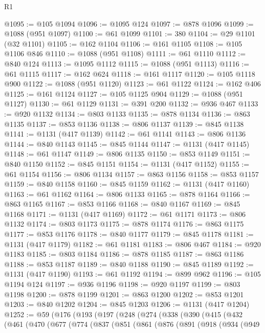 \begin{lexlean}{R1}
\begin{coremodule}
{{{{{{{{{{{{{{{{{{{{{{{{{{{{{{{{{{{{{{{{{{{{{{{{{{{{{{{{{{{{{{{{{{{{{{{{{{{{{{{{{{{{{{{{{{@1095 := @105 @1094
@1096 := @1095 @124
@1097 := @878 @1096
@1099 := @1088 (@951 @1097)
@1100 := @61 @1099
@1101 := 380
@1104 := @29 @1101 (@32 @1101)
@1105 := @162 @1104
@1106 := @161 @1105
@1108 := @105 @1106 @846
@1110 := @1088 (@951 @1108)
@1111 := @61 @1110
@1112 := @840 @124
@1113 := @1095 @1112
@1115 := @1088 (@951 @1113)
@1116 := @61 @1115
@1117 := @162 @624
@1118 := @161 @1117
@1120 := @105 @1118 @900
@1122 := @1088 (@951 @1120)
@1123 := @61 @1122
@1124 := @162 @406
@1125 := @161 @1124
@1127 := @105 @1125 @904
@1129 := @1088 (@951 @1127)
@1130 := @61 @1129
@1131 := @391 @200
@1132 := @936 @467
@1133 := @920 @1132
@1134 := @803 @1133
@1135 := @878 @1134
@1136 := @863 @1135
@1137 := @853 @1136
@1138 := @806 @1137
@1139 := @845 @1138
@1141 := @1131 (@417 @1139)
@1142 := @61 @1141
@1143 := @806 @1136
@1144 := @840 @1143
@1145 := @845 @1144
@1147 := @1131 (@417 @1145)
@1148 := @61 @1147
@1149 := @806 @1135
@1150 := @853 @1149
@1151 := @840 @1150
@1152 := @845 @1151
@1154 := @1131 (@417 @1152)
@1155 := @61 @1154
@1156 := @806 @1134
@1157 := @863 @1156
@1158 := @853 @1157
@1159 := @840 @1158
@1160 := @845 @1159
@1162 := @1131 (@417 @1160)
@1163 := @61 @1162
@1164 := @806 @1133
@1165 := @878 @1164
@1166 := @863 @1165
@1167 := @853 @1166
@1168 := @840 @1167
@1169 := @845 @1168
@1171 := @1131 (@417 @1169)
@1172 := @61 @1171
@1173 := @806 @1132
@1174 := @803 @1173
@1175 := @878 @1174
@1176 := @863 @1175
@1177 := @853 @1176
@1178 := @840 @1177
@1179 := @845 @1178
@1181 := @1131 (@417 @1179)
@1182 := @61 @1181
@1183 := @806 @467
@1184 := @920 @1183
@1185 := @803 @1184
@1186 := @878 @1185
@1187 := @863 @1186
@1188 := @853 @1187
@1189 := @840 @1188
@1190 := @845 @1189
@1192 := @1131 (@417 @1190)
@1193 := @61 @1192
@1194 := @899 @962
@1196 := @105 @1194 @124
@1197 := @936 @1196
@1198 := @920 @1197
@1199 := @803 @1198
@1200 := @878 @1199
@1201 := @863 @1200
@1202 := @853 @1201
@1203 := @840 @1202
@1204 := @845 @1203
@1206 := @1131 (@417 @1204)
@1252 := @59
    (@176
      (@193
        (@197
          (@248
            (@274
              (@338
                (@390
                  (@415
                    (@432
                      (@461
                        (@470
                          (@677
                            (@774
                              (@837
                                (@851
                                  (@861
                                    (@876
                                      (@891
                                        (@918
                                          (@934
                                            (@949
}}}}}}}}}}}}}}}}}}}}}}}}}}}}}}}}}}}}}}}}}}}}}}}}}}}}}}}}}}}}}}}}}}}}}}}}}}}}}}}}}}}}}}}}}}
\end{coremodule}
\end{lexlean}
